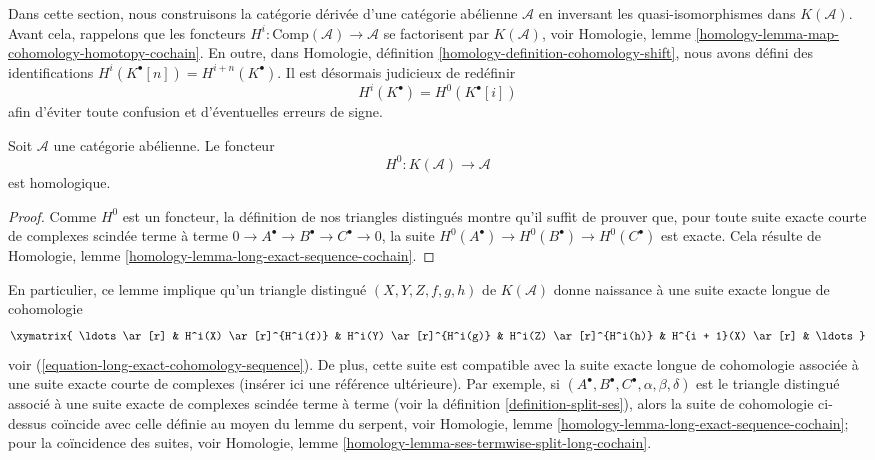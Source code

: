 \noindent
Dans cette section, nous construisons la catégorie dérivée d'une catégorie
abélienne $\mathcal{A}$ en inversant les quasi-isomorphismes dans
$K(\mathcal{A})$. Avant cela, rappelons que les foncteurs
$H^i : \text{Comp}(\mathcal{A}) \to \mathcal{A}$ se factorisent par
$K(\mathcal{A})$, voir Homologie, lemme
\ref{homology-lemma-map-cohomology-homotopy-cochain}. En outre, dans Homologie,
définition \ref{homology-definition-cohomology-shift}, nous avons défini des
identifications $H^i(K^\bullet[n]) = H^{i + n}(K^\bullet)$. Il est désormais
judicieux de redéfinir
$$
H^i(K^\bullet) = H^0(K^\bullet[i])
$$
afin d'éviter toute confusion et d'éventuelles erreurs de signe.

\begin{lemma}
\label{lemma-cohomology-homological}
Soit $\mathcal{A}$ une catégorie abélienne. Le foncteur
$$
H^0 : K(\mathcal{A}) \longrightarrow \mathcal{A}
$$
est homologique.
\end{lemma}

\begin{proof}
Comme $H^0$ est un foncteur, la définition de nos triangles distingués montre
qu'il suffit de prouver que, pour toute suite exacte courte de complexes
scindée terme à terme
$0 \to A^\bullet \to B^\bullet \to C^\bullet \to 0$, la suite
$H^0(A^\bullet) \to H^0(B^\bullet) \to H^0(C^\bullet)$ est exacte. Cela
résulte de Homologie, lemme
\ref{homology-lemma-long-exact-sequence-cochain}.
\end{proof}

\noindent
En particulier, ce lemme implique qu'un triangle distingué
$(X, Y, Z, f, g, h)$ de $K(\mathcal{A})$ donne naissance à une suite exacte
longue de cohomologie
\begin{equation}
\label{equation-long-exact-cohomology-sequence-D}
\xymatrix{
\ldots \ar[r] &
H^i(X) \ar[r]^{H^i(f)} &
H^i(Y) \ar[r]^{H^i(g)} &
H^i(Z) \ar[r]^{H^i(h)} &
H^{i + 1}(X) \ar[r] & \ldots
}
\end{equation}
voir (\ref{equation-long-exact-cohomology-sequence}). De plus, cette suite est
compatible avec la suite exacte longue de cohomologie associée à une suite
exacte courte de complexes (insérer ici une référence ultérieure). Par exemple, si
$(A^\bullet, B^\bullet, C^\bullet, \alpha, \beta, \delta)$ est le triangle
distingué associé à une suite exacte de complexes scindée terme à terme (voir
la définition \ref{definition-split-ses}), alors la suite de cohomologie
ci-dessus coïncide avec celle définie au moyen du lemme du serpent, voir
Homologie, lemme \ref{homology-lemma-long-exact-sequence-cochain}; pour la
coïncidence des suites, voir Homologie, lemme
\ref{homology-lemma-ses-termwise-split-long-cochain}.

